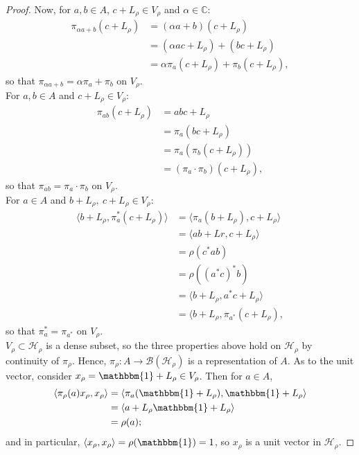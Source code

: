 \documentclass[12pt,a4paper]{report}
\theoremstyle{plain}
\theoremstyle{definition}
\newcommand{\1}{\mathbbm{1}}
\newcommand{\B}{\mathcal{B}}
\newcommand{\Hr}{\mathcal{H}_\rho}
\newcommand{\Vr}{V_\rho}
\newcommand{\Lr}{L_\rho}
\newcommand{\xr}{x_\rho}
\begin{document}
\begin{proof}
	Now, for $a,b \in A$, $c+ L_\rho \in \Vr$ and $\alpha \in \mathbb{C}$:
	\begin{align*}
				\pi_{\alpha a+b}(c+\Lr)
		&=		(\alpha a+b) (c+\Lr)										\\
		&=		(\alpha ac +\Lr) + (bc+\Lr)									\\
		&=		\alpha \pi_a (c+\Lr) + \pi_b(c+\Lr),
	\end{align*}
	so that $\pi_{\alpha a + b} = \alpha \pi_a +\pi_b$ on $\Vr$.\\
	For $a,b \in A$ and $c+ L_\rho \in \Vr$:
	\begin{align*}
		\pi_{ab}(c+\Lr)
		&=		abc+\Lr														\\
		&=		\pi_a (bc+\Lr)												\\
		&=		\pi_a (\pi_b (c+\Lr))										\\
		&=		(\pi_a \cdot \pi_b) (c+\Lr),
	\end{align*}
	so that $\pi_{a b} = \pi_a \cdot \pi_b$ on $\Vr$.\\
	For $a\in A$ and $b+ L_\rho,~c+ L_\rho \in \Vr$:
	\begin{align*}
				\langle b+\Lr, \pi_a^\ast (c+\Lr) \rangle 
		&=		\langle \pi_a (b+\Lr), c+\Lr \rangle						\\
		&=		\langle ab +Lr, c+\Lr \rangle								\\
		&=		\rho(c^\ast ab)												\\
		&=		\rho((a^\ast c)^\ast b)										\\
		&=		\langle b+\Lr, a^\ast c+\Lr \rangle							\\
		&=		\langle b+\Lr, \pi_{a^\ast}(c+\Lr),
	\end{align*}
	so that $ \pi_a^\ast = \pi_{a^\ast}$ on $\Vr$.\\
	$\Vr \subset \Hr$ is a dense subset, so the three properties above hold on 
	$\Hr$ by continuity of $\pi_\rho$. 
	Hence, $\pi_\rho: A \to \B(\Hr)$ is a representation of $A$.
	As to the unit vector, consider $\xr = \1 + \Lr \in \Vr$. Then for $a \in A$,
	\begin{align*}
				\langle \pi_\rho(a)\xr ,\xr \rangle 
		&=		\langle \pi_a(\1+\Lr), \1+\Lr \rangle						\\
		&=		\langle a+\Lr \1+\Lr \rangle								\\
		&=		\rho(a);
	\end{align*}
	and in particular, $\langle \xr,\xr \rangle = \rho (\1) = 1$, so $\xr$ is a unit vector in $\Hr$.	
\end{proof}
\end{document}
